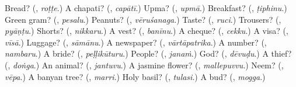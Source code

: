\begin{tcolorbox}[breakable,colback=teal!4,colframe=teal!35!black,title={Before you move on}]
Bread? (\textbf{}, \emph{roṭṭe}.) A chapati? (\textbf{}, \emph{capātī}.) Upma? (\textbf{}, \emph{upmā}.) Breakfast? (\textbf{}, \emph{ṭiphinu}.) Green gram? (\textbf{}, \emph{pesalu}.) Peanuts? (\textbf{}, \emph{vēruśanaga}.) Taste? (\textbf{}, \emph{ruci}.) Trousers? (\textbf{}, \emph{pyāṇṭu}.) Shorts? (\textbf{}, \emph{nikkaru}.) A vest? (\textbf{}, \emph{banīnu}.) A cheque? (\textbf{}, \emph{cekku}.) A visa? (\textbf{}, \emph{vīsā}.) Luggage? (\textbf{}, \emph{sāmānu}.) A newspaper? (\textbf{}, \emph{vārtāpatrika}.) A number? (\textbf{}, \emph{nambaru}.) A bride? (\textbf{}, \emph{peḷḷikūturu}.) People? (\textbf{}, \emph{janaṁ}.) God? (\textbf{}, \emph{dēvuḍu}.) A thief? (\textbf{}, \emph{doṅga}.) An animal? (\textbf{}, \emph{jantuvu}.) A jasmine flower? (\textbf{}, \emph{mallepuvvu}.) Neem? (\textbf{}, \emph{vēpa}.) A banyan tree? (\textbf{}, \emph{marri}.) Holy basil? (\textbf{}, \emph{tulasi}.) A bud? (\textbf{}, \emph{mogga}.)
\end{tcolorbox}
